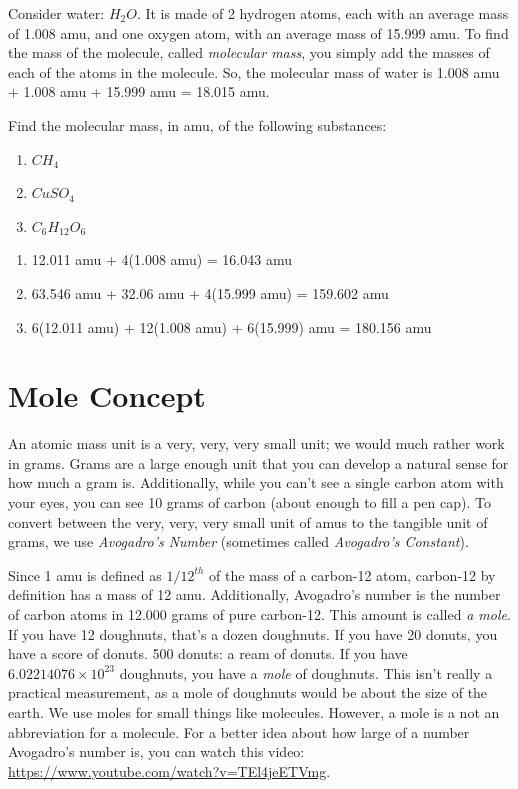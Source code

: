 Consider water: $H_2 O$. It is made of 2 hydrogen atoms, each with an average 
mass of 1.008 amu, and one oxygen atom, with an average mass of 15.999 amu. To 
find the mass of the molecule, called \textit{molecular mass}, you simply add the 
masses of each of the atoms in the molecule. So, the molecular mass of water is 
1.008 amu + 1.008 amu + 15.999 amu = 18.015 amu. 

\begin{Exercise}[title = {Determining Molecular Mass}, label = molecular]
Find the molecular mass, in amu, of the following substances:
\begin{enumerate}
\item $CH_4$
\item $CuSO_4$
\item $C_6H_{12}O_6$
\end{enumerate}
\end{Exercise} 

\begin{Answer}[ref = molecular]
\begin{enumerate}
\item 12.011 amu + 4(1.008 amu) = 16.043 amu
\item 63.546 amu + 32.06 amu + 4(15.999 amu) = 159.602 amu
\item 6(12.011 amu) + 12(1.008 amu) + 6(15.999) amu = 180.156 amu
\end{enumerate}
\end{Answer}

\section{Mole Concept}

An atomic mass unit is a very, very, very small unit; we would much rather work in
grams. Grams are a large enough unit that you can develop a natural sense for how 
much a gram is. Additionally, while you can't see a single carbon atom with your 
eyes, you can see 10 grams of carbon (about enough to fill a pen cap). To convert
between the very, very, very small unit of amus to the tangible unit of grams, we 
use \textit{Avogadro's Number} (sometimes called \textit{Avogadro's Constant}).

Since 1 amu is defined as $1/12^{th}$ of the mass of a carbon-12 atom, carbon-12 
by definition has a mass of 12 amu. Additionally, Avogadro's number is the number 
of carbon atoms in 12.000 grams of pure carbon-12. This amount is called \textit{a
mole}. If you have 12 doughnuts, that's a dozen doughnuts. If you have 20 donuts, 
you have a score of donuts. 500 donuts: a ream of donuts. If you have $6.02214076 
\times 10^{23}$ doughnuts, you have a \textit{mole} of doughnuts. This isn't 
really a practical measurement, as a mole of doughnuts would be about the size of 
the earth. We use moles for small things like molecules. However, a mole is a not an abbreviation for a molecule. For a better 
idea about how large of a number Avogadro's number is, you can watch this video: 
\url{https://www.youtube.com/watch?v=TEl4jeETVmg}. 

